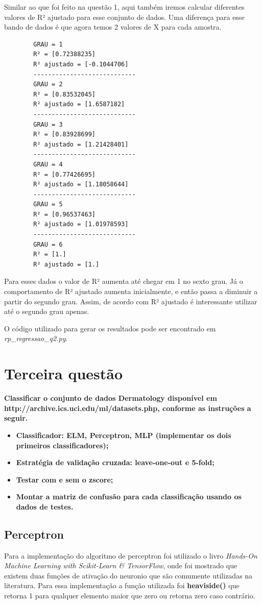 \documentclass[paper=a4, fontsize=11pt]{scrartcl}
\numberwithin{equation}{section}		%
\numberwithin{figure}{section}			%
\numberwithin{table}{section}				%
\begin{document}
	Similar ao que foi feito na questão 1, aqui também iremos calcular diferentes valores de R² ajustado para esse conjunto de dados. Uma diferença para esse bando de dados é que agora temos 2 valores de X para cada amostra.
	\begin{multicols}{2}
    	\begin{verbatim}
    	GRAU = 1
    	R² = [0.72388235]
    	R² ajustado = [-0.1044706]
    	----------------------------
    	GRAU = 2
    	R² = [0.83532045]
    	R² ajustado = [1.6587182]
    	----------------------------
    	GRAU = 3
    	R² = [0.83928699]
    	R² ajustado = [1.21428401]
    	----------------------------
    	GRAU = 4
    	R² = [0.77426695]
    	R² ajustado = [1.18058644]
    	----------------------------
    	GRAU = 5
    	R² = [0.96537463]
    	R² ajustado = [1.01978593]
    	----------------------------
    	GRAU = 6
    	R² = [1.]
    	R² ajustado = [1.]
    	\end{verbatim}
	\end{multicols}
	Para esses dados o valor de R² aumenta até chegar em 1 no sexto grau. 
	Já o comportamento de R² ajustado aumenta inicialmente, e então passa a diminuir a partir do segundo grau. Assim, de acordo com R² ajustado é interessante utilizar até o segundo grau apenas.
	
	O código utilizado para gerar os resultados pode ser encontrado em \textit{rp\_regressao\_q2.py}.
	
	\newpage
	
	\section{Terceira questão}
	
	\textbf{Classificar o conjunto de dados Dermatology disponível em http://archive.ics.uci.edu/ml/datasets.php, conforme as instruções a seguir.}
	\begin{itemize}
		\item \textbf{Classificador: ELM, Perceptron, MLP (implementar os dois primeiros classificadores);}
		\item \textbf{Estratégia de validação cruzada: leave-one-out e 5-fold;}
		\item \textbf{Testar com e sem o zscore;}
		\item \textbf{Montar a matriz de confusão para cada classificação usando os dados de testes. }
	\end{itemize}

	
	
	\subsection{\textbf{Perceptron}}
	Para a implementação do algoritmo de perceptron foi utilizado o livro \textit{Hands-On Machine Learning with Scikit-Learn \& TensorFlow}, onde foi mostrado que existem duas funções de ativação do neuronio que são comumente utilizadas na literatura. Para essa implementação a função utilizada foi \textbf{heaviside()} que retorna 1 para qualquer elemento maior que zero ou retorna zero caso contrário.
	
\end{document}
